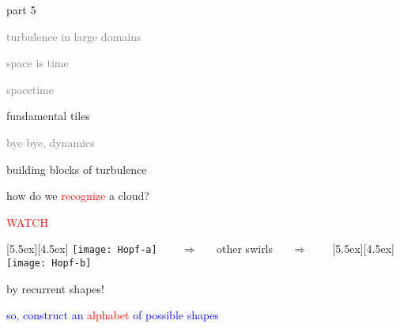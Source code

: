 \begin{frame}{part 5}
\begin{enumerate}
              \item
    \textcolor{gray}{\small
turbulence in large domains
              \item
space is time
              \item
spacetime
    }
              \item {\Large
fundamental tiles
    }\textcolor{gray}{\small
              \item
bye bye, dynamics
                    }
            \end{enumerate}
\end{frame}


\begin{frame}{building blocks of turbulence}

how do we \textcolor{red}{recognize} a cloud?

\bigskip
\begin{center}
\centerline{\textcolor{red}{\Huge WATCH}}

\begin{minipage}[t]{\textwidth}
	\begin{center}
\centerline{
\raisebox{-4.0ex}[5.5ex][4.5ex]
		 {\texttt{[image: Hopf-a]}}
~~~ $\Longrightarrow$ ~~ {other swirls} ~~ $\Longrightarrow$ ~~~
	\raisebox{-4.0ex}[5.5ex][4.5ex]
		 {\texttt{[image: Hopf-b]}}
          }
	\end{center}
\end{minipage}
\end{center}

\bigskip

{\Large by recurrent shapes!}

\vfill

\centerline{
\textcolor{blue}{so, construct an \textcolor{red}{\Large alphabet} of possible shapes}
}
\end{frame}

